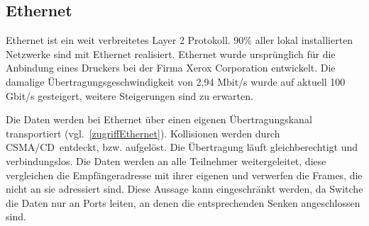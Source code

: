 \documentclass[12pt, a4paper, ngerman]{article}
\begin{document}
\subsection{Ethernet}
Ethernet ist ein weit verbreitetes Layer 2 Protokoll. 90\% aller lokal installierten Netzwerke sind mit Ethernet realisiert\cite{SWB-097965316}. Ethernet wurde ursprünglich für die Anbindung eines Druckers bei der Firma Xerox Corporation entwickelt. Die damalige Über\-tragungs\-geschwindig\-keit von 2,94 Mbit/s wurde auf aktuell 100 Gbit/s gesteigert, weitere Steigerungen sind zu erwarten.

Die Daten werden bei Ethernet über einen eigenen Übertragungskanal transportiert (vgl.~\ref{zugriffEthernet}). Kollisionen werden durch \glqq CSMA/CD\grqq ~entdeckt, bzw. aufgelöst. Die Über\-trag\-ung läuft gleichberechtigt und verbindungslos. Die Daten werden an alle Teilnehmer weitergeleitet, diese vergleichen die Empfängeradresse mit ihrer eigenen und verwerfen die Frames, die nicht an sie adressiert sind. Diese Aussage kann eingeschränkt werden, da Switche die Daten nur an Ports leiten, an denen die entsprechenden Senken angeschlossen sind. 
\end{document}
